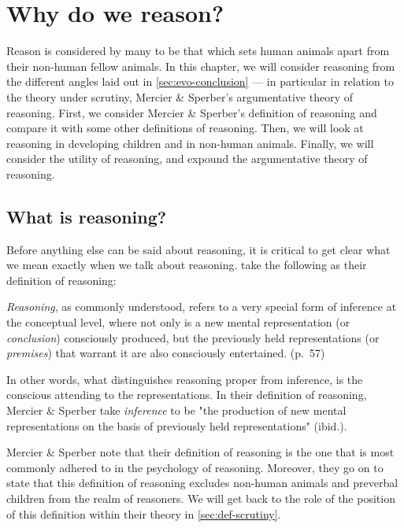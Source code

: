 \chapter{Why do we reason?}
\label{ch:reasoning}

Reason is considered by many to be that which sets human animals apart from their non-human fellow animals. In this chapter, we will consider reasoning from the different angles laid out in \cref{sec:evo-conclusion} --- in particular in relation to the theory under scrutiny, Mercier \& Sperber's argumentative theory of reasoning. First, we consider Mercier \& Sperber's definition of reasoning and compare it with some other definitions of reasoning. Then, we will look at reasoning in developing children and in non-human animals. Finally, we will consider the utility of reasoning, and expound the argumentative theory of reasoning.

\section{What is reasoning?}

Before anything else can be said about reasoning, it is critical to get clear what we mean exactly when we talk about reasoning. \citet{MS11} take the following as their definition of reasoning:

\begin{quoting}
    \emph{Reasoning}, as commonly understood, refers to a very special form of inference at the conceptual level, where not only is a new mental representation (or \emph{conclusion}) consciously produced, but the previously held representations (or \emph{premises}) that warrant it are also consciously entertained.
    \hfill (p.~57)
\end{quoting}
In other words, what distinguishes reasoning proper  from inference, is the conscious attending to the representations.
In their definition of reasoning, Mercier \& Sperber take \emph{inference} to be "the production of new mental representations on the basis of previously held representations" (ibid.).

Mercier \& Sperber note that their definition of reasoning is the one that is most commonly adhered to in the psychology of reasoning.
Moreover, they go on to state that this definition of reasoning excludes non-human animals and preverbal children from the realm of reasoners.
We will get back to the role of the position of this definition within their theory in \cref{sec:def-scrutiny}.

